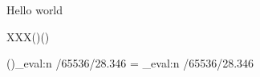 \documentclass{article}
\begin{document}
Hello world\pdfsavepos{}\pdfsavepos


\lipsum[1][1-3] XXX()()\lipsum[1][4-5]

\ExplSyntaxOn
(\the\pdflastxpos)\fp_eval:n {\the\pdflastxpos/65536/28.346} =
\fp_eval:n {/65536/28.346}
\ExplSyntaxOff
\end{document}
